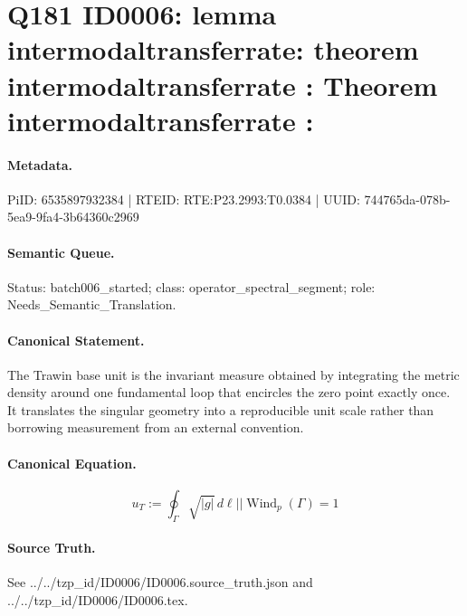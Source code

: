 \section*{Q181 ID0006: lemma intermodaltransferrate: theorem intermodaltransferrate : Theorem intermodaltransferrate :}
\paragraph{Metadata.}
PiID: 6535897932384 | RTEID: RTE:P23.2993:T0.0384 | UUID: 744765da-078b-5ea9-9fa4-3b64360c2969

\paragraph{Semantic Queue.}
Status: batch006\_started; class: operator\_spectral\_segment; role: Needs\_Semantic\_Translation.

\paragraph{Canonical Statement.}
The Trawin base unit is the invariant measure obtained by integrating the metric density around one fundamental loop that encircles the zero point exactly once. It translates the singular geometry into a reproducible unit scale rather than borrowing measurement from an external convention.

\paragraph{Canonical Equation.}
\[
u_{T} := \oint_{\Gamma} \sqrt{\lvert g \rvert}\, d\ell || \operatorname{Wind}_{p}(\Gamma)=1
\]

\paragraph{Source Truth.}
See ../../tzp\_id/ID0006/ID0006.source\_truth.json and ../../tzp\_id/ID0006/ID0006.tex.
